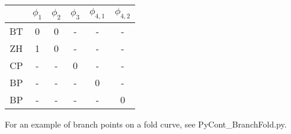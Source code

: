 \documentclass{article}[12pt]
\begin{document}
\begin{center}
    \begin{tabular}{ | c | c | c | c | c | c | }
    \hline
     & $\phi_{1}$ & $\phi_{2}$ & $\phi_{3}$ & $\phi_{4,1}$ & $\phi_{4,2}$ \\ \hline
    BT & 0 & 0 & - & - & - \\ \hline
    ZH & 1 & 0 & - & - & - \\ \hline
    CP & - & - & 0 & - & - \\ \hline
    BP & - & - & - & 0 & - \\ \hline
    BP & - & - & - & - & 0 \\ \hline 
    \end{tabular}
\end{center}

For an example of branch points on a fold curve, see PyCont\_BranchFold.py.



\end{document}

